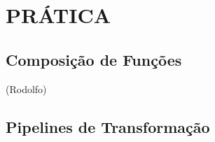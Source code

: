 \section{PRÁTICA}





\subsection{Composição de Funções}
(Rodolfo)
\subsection{Pipelines de Transformação}